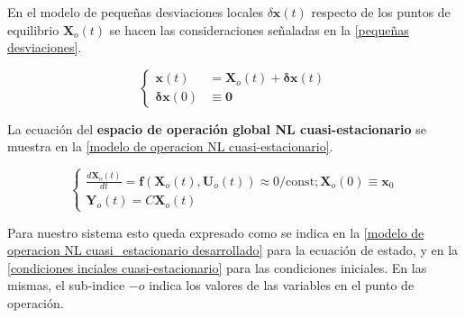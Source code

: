 \documentclass[a4paper, 10pt, onecolumn,journal]{ieeeconf}
\begin{document}
En el modelo de pequeñas desviaciones locales $\delta \mathbf{x}(t)$ respecto de los puntos de equilibrio $\mathbf{X}_o(t)$
se hacen las consideraciones señaladas en la \cref{pequeñas desviaciones}.

\begin{equation}
    \begin{cases}
    \mathbf{x}(t)  &= \mathbf{X}_o(t) + \mathbf{\delta x}(t)\\
    \mathbf{\delta x}(0) &\equiv \mathbf{0}
    \end{cases}
    \label{pequeñas desviaciones}
\end{equation}

La ecuación del \textbf{espacio de operación global NL cuasi-estacionario} se muestra en la \cref{modelo de operacion NL cuasi-estacionario}.

\begin{equation}
    \begin{cases}
    \frac{d\mathbf{X}_o(t)}{dt} =  \mathbf{f}(\mathbf{X}_o(t), \mathbf{U}_o(t)) \approx 0/\text{const};  \mathbf{X}_o(0) \equiv \mathbf{x}_0\\
    \mathbf{Y}_o(t) = C \mathbf{X}_o(t)
    \end{cases}
    \label{modelo de operacion NL cuasi-estacionario}
\end{equation}

Para nuestro sistema esto queda expresado como se indica en la \cref{modelo de operacion NL cuasi_estacionario desarrollado} para la ecuación de estado, y en la \cref{condiciones inciales cuasi-estacionario} para las condiciones iniciales.
En las mismas, el sub-indice $-o$ indica los valores de las variables en el punto de operación.
\end{document}
